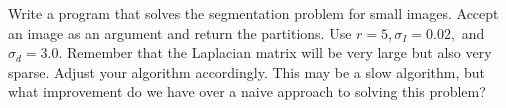 \begin{problem}  Write a program that solves the segmentation problem for small images.  Accept an image as an argument and return the partitions. Use $r = 5, \sigma_I = 0.02,$ and $\sigma_d = 3.0$. Remember that the Laplacian matrix will be very large but also very sparse.  Adjust your algorithm accordingly.  This may be a slow algorithm, but what improvement do we have over a naive approach to solving this problem?
\end{problem}

